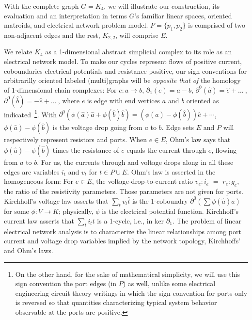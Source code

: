 With the complete graph $G=K_4$, we will illustrate our construction,
its evaluation and an interpretation
in terms $G$'s familiar linear spaces, oriented matroids, and electrical
network problem model.  $P=\{p_1, p_2\}$ is comprised of two non-adjacent
edges and the rest, $K_{2,2}$, will comprise $E$.  

We relate $K_4$ as a 1-dimensional abstract simplicial complex to
its role as an electrical network model.
To make our cycles represent flows of positive current,
coboundaries electrical potentials and resistance positive,
our sign conventions for arbitrarilly oriented labeled (multi)graphs
will be \emph{opposite that of} the homology of 1-dimensional chain complexes:
For $e : a \rightarrow b$, $\partial_1(e)=a-b$, $\partial^0(\hat{a})=\hat{e}+ \ldots\  $,
$\partial^0(\hat{b})=-\hat{e}+ \ldots\  $, where $e$ is edge with end vertices $a$ and $b$ oriented
as indicated\
\footnote{
On the other hand, for the sake of mathematical simplicity,
we will use this sign convention the port edges (in $P$) as well, unlike some electrical engineering
circuit theory writings in which the sign convention for ports only is reversed
so that quantities characterizing typical system behavior observable at the ports
are positive.}.
With $\partial^0(\phi(\hat{a}) \hat{a} + \phi(\hat{b}) \hat{b}) = (\phi(\hat{a})-\phi(\hat{b}))\hat{e} + \cdots$,
$\phi(\hat{a})-\phi(\hat{b})$ is the voltage drop going from $a$ to $b$.
Edge sets $E$ and $P$ will respectively represent resistors and ports.
When $e\in E$,
Ohm's law says that
$\phi(\hat{a})-\phi(\hat{b})$ times the resistance of $e$ equals the current through $e$,
flowing from $a$ to $b$.
For us, the currents through and voltage drops along
in all these edges are variables $i_t$ and $v_t$ for $t\in P\cup E$.  Ohm's law
is asserted in the homogeneous form:  For $e\in E$, the voltage-drop-to-current ratio
$v_e:i_e$ $=$ $r_e:g_e$, the ratio of the resistivity parameters.
Those parameters are not given for ports.
Kirchhoff's voltage law asserts that $\sum_tv_t\hat{t}$ is the 1-coboundry $\partial^0(\sum \phi(\hat{a})\hat{a})$
for some $\phi:V\rightarrow K$; physically, $\phi$ is the electrical potential function.
Kirchhoff's current law asserts that $\sum_ti_t t$ is a 1-cycle, i.e., in $\text{ker }\partial_1$. 
The problem of linear electrical network analysis is to characterize
the linear relationships among port current and voltage drop variables implied by
the network topology, Kirchhoffs' and Ohm's laws.  


